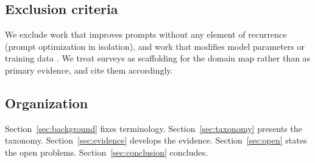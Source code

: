 \subsection{Exclusion criteria}

We exclude work that improves prompts without any element of recurrence
(prompt optimization in isolation), and work that modifies model parameters or
training data . We treat surveys as scaffolding for the domain map rather than as
primary evidence, and cite them accordingly.

\subsection{Organization}

Section~\ref{sec:background} fixes terminology. Section~\ref{sec:taxonomy}
presents the taxonomy. Section~\ref{sec:evidence} develops the evidence.
Section~\ref{sec:open} states the open problems.
Section~\ref{sec:conclusion} concludes.
